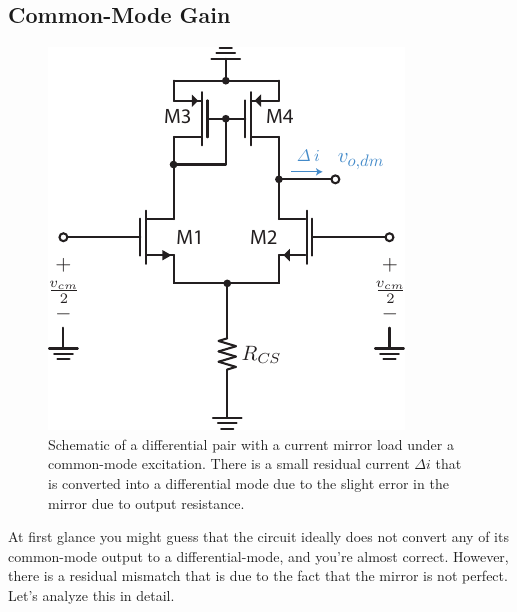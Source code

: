 \subsection{Common-Mode Gain}



\begin{figure}[tb]
\begin{center}
\includegraphics[scale=1]{Diffpair_se_cmgain.pdf}
\end{center}
\caption{Schematic of a differential pair with a current mirror load under a common-mode excitation.  There is a small residual current $\Delta i$ that is converted into a differential mode due to the slight error in the mirror due to output resistance.} \label{fig:Diffpair_se_cmgain.pdf}
\end{figure}

At first glance you might guess that the circuit ideally does not convert any of its common-mode output to a differential-mode, and you're almost correct.  However, there is a residual mismatch that is due to the fact that the mirror is not perfect.  Let's analyze this in detail.

